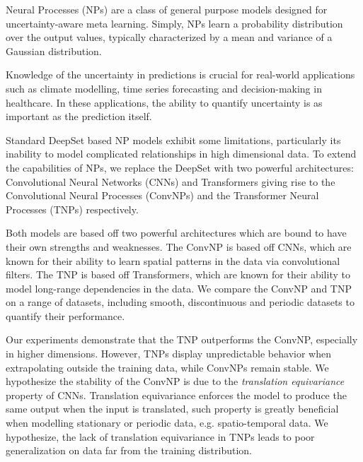 \documentclass[../../main.tex]{subfiles}
\begin{document}

Neural Processes (NPs) are a class of general purpose models designed for uncertainty-aware meta learning. Simply, NPs learn a probability distribution over the output values, typically characterized by a mean and variance of a Gaussian distribution.

Knowledge of the uncertainty in predictions is crucial for real-world applications such as climate modelling, time series forecasting and decision-making in healthcare. In these applications, the ability to quantify uncertainty is as important as the prediction itself. 

Standard DeepSet based NP models exhibit some limitations, particularly its inability to model complicated relationships in high dimensional data. To extend the capabilities of NPs, we replace the DeepSet with two powerful architectures: Convolutional Neural Networks (CNNs) and Transformers giving rise to the Convolutional Neural Processes (ConvNPs) and the Transformer Neural Processes (TNPs) respectively. 

Both models are based off two powerful architectures which are bound to have their own strengths and weaknesses. The ConvNP is based off CNNs, which are known for their ability to learn spatial patterns in the data via convolutional filters. The TNP is based off Transformers, which are known for their ability to model long-range dependencies in the data. We compare the ConvNP and TNP on a range of datasets, including smooth, discontinuous and periodic datasets to quantify their performance.

Our experiments demonstrate that the TNP outperforms the ConvNP, especially in higher dimensions. However, TNPs display unpredictable behavior when extrapolating outside the training data, while ConvNPs remain stable. We hypothesize the stability of the ConvNP is due to the \emph{translation equivariance} property of CNNs. Translation equivariance enforces the model to produce the same output when the input is translated, such property is greatly beneficial when modelling stationary or periodic data, e.g. spatio-temporal data.
We hypothesize, the lack of translation equivariance in TNPs leads to poor generalization on data far from the training distribution.
\end{document}
